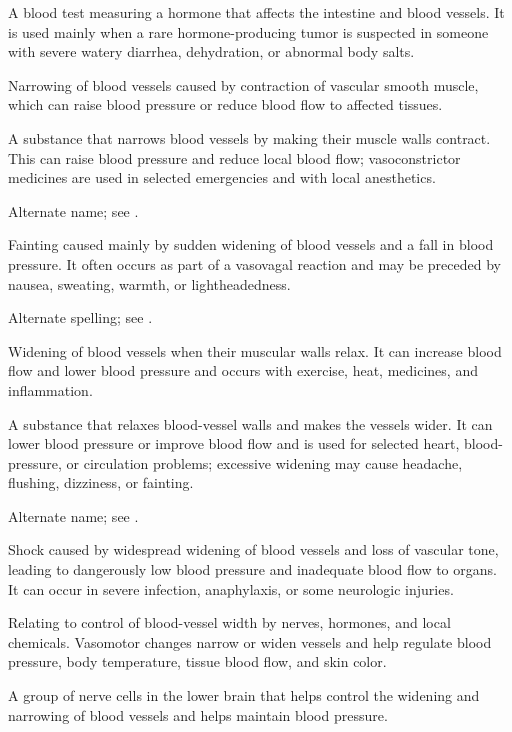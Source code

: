  A blood test measuring a hormone that affects the intestine and blood vessels. It is used mainly when a rare hormone-producing tumor is suspected in someone with severe watery diarrhea, dehydration, or abnormal body salts.

 Narrowing of blood vessels caused by contraction of vascular smooth muscle, which can raise blood pressure or reduce blood flow to affected tissues.

 A substance that narrows blood vessels by making their muscle walls contract. This can raise blood pressure and reduce local blood flow; vasoconstrictor medicines are used in selected emergencies and with local anesthetics.

 Alternate name; see .

 Fainting caused mainly by sudden widening of blood vessels and a fall in blood pressure. It often occurs as part of a vasovagal reaction and may be preceded by nausea, sweating, warmth, or lightheadedness.

 Alternate spelling; see .

 Widening of blood vessels when their muscular walls relax. It can increase blood flow and lower blood pressure and occurs with exercise, heat, medicines, and inflammation.

 A substance that relaxes blood-vessel walls and makes the vessels wider. It can lower blood pressure or improve blood flow and is used for selected heart, blood-pressure, or circulation problems; excessive widening may cause headache, flushing, dizziness, or fainting.

 Alternate name; see .

 Shock caused by widespread widening of blood vessels and loss of vascular tone, leading to dangerously low blood pressure and inadequate blood flow to organs. It can occur in severe infection, anaphylaxis, or some neurologic injuries.

 Relating to control of blood-vessel width by nerves, hormones, and local chemicals. Vasomotor changes narrow or widen vessels and help regulate blood pressure, body temperature, tissue blood flow, and skin color.

 A group of nerve cells in the lower brain that helps control the widening and narrowing of blood vessels and helps maintain blood pressure.


